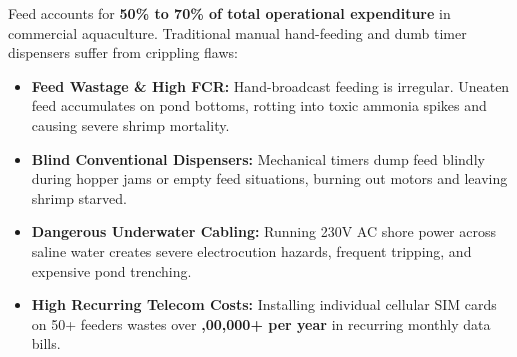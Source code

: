 \documentclass[10pt,a4paper]{article}
\begin{document}
\begin{minipage}[t]{0.488\linewidth}
  \begin{tcolorbox}[
    enhanced,
    colback=CardBg,
    colframe=AmberBorder,
    arc=2mm,
    boxrule=1.1pt,
    title={\fontsize{8.5}{10.5}\selectfont \textbf{\textcolor{white}{The Industry Challenge: Costly Feeding Inefficiency}}},
    coltitle=white,
    colbacktitle=AmberDark,
    top=7pt, bottom=7pt, left=8pt, right=8pt
  ]
    {\fontsize{7.8}{10.8}\selectfont \textcolor{TextPrimary}{
    Feed accounts for \textbf{50\% to 70\% of total operational expenditure} in commercial aquaculture. Traditional manual hand-feeding and dumb timer dispensers suffer from crippling flaws:
    \begin{itemize}[leftmargin=11pt, itemsep=3.5pt, topsep=3pt, parsep=0pt]
      \item \textbf{Feed Wastage \& High FCR:} Hand-broadcast feeding is irregular. Uneaten feed accumulates on pond bottoms, rotting into toxic ammonia spikes and causing severe shrimp mortality.
      \item \textbf{Blind Conventional Dispensers:} Mechanical timers dump feed blindly during hopper jams or empty feed situations, burning out motors and leaving shrimp starved.
      \item \textbf{Dangerous Underwater Cabling:} Running 230V AC shore power across saline water creates severe electrocution hazards, frequent tripping, and expensive pond trenching.
      \item \textbf{High Recurring Telecom Costs:} Installing individual cellular SIM cards on 50+ feeders wastes over \textbf{,00,000+ per year} in recurring monthly data bills.
    \end{itemize}
    }}
  \end{tcolorbox}
\end{minipage}
\hfill
\end{document}
